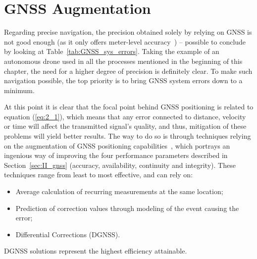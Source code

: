 \section{GNSS Augmentation}\label{sec:II_gnssAug}

Regarding precise navigation, the precision obtained solely by relying on GNSS is not good enough (as it only offers meter-level accuracy~\cite{novatel_gnss}) -- possible to conclude by looking at Table~\ref{tab:GNSS_sys_errors}. Taking the example of an autonomous drone used in all the processes mentioned in the beginning of this chapter, the need for a higher degree of precision is definitely clear. To make such navigation possible, the top priority is to bring GNSS system errors down to a minimum.

At this point it is clear that the focal point behind GNSS positioning is related to equation (\ref{eq:2_1}), which means that any error connected to distance, velocity or time will affect the transmitted signal's quality, and thus, mitigation of these problems will yield better results.
The way to do so is through techniques relying on the augmentation of GNSS positioning capabilities~\cite{novatel_gnss,kaplan_2017}, which portrays an ingenious way of improving the four performance parameters described in Section~\ref{sec:II_gnss} (accuracy, availability, continuity and integrity).
These techniques range from least to most effective, and can rely on:

\begin{itemize}
    \item Average calculation of recurring measurements at the same location;
    \item Prediction of correction values through modeling of the event causing the error;
    \item Differential Corrections (DGNSS).
\end{itemize}
DGNSS solutions represent the highest efficiency attainable. %




